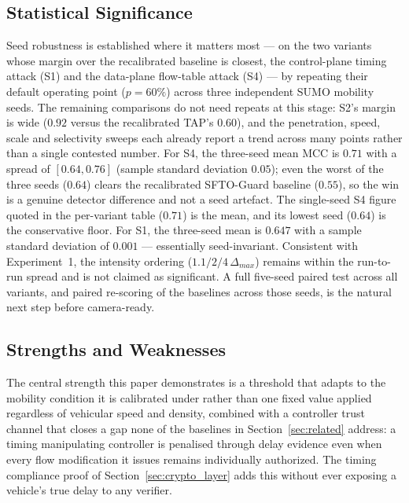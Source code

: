 \documentclass[final,5p,twocolumn]{elsarticle}
\theoremstyle{remark}
\theoremstyle{plain}
\begin{document}
\subsection{Statistical Significance}
\label{sec:significance}
Seed robustness is established where it matters most --- on the two variants
whose margin over the recalibrated baseline is closest, the control-plane timing
attack (S1) and the data-plane flow-table attack (S4) --- by repeating their
default operating point ($p{=}60\%$) across three independent SUMO mobility
seeds. The remaining comparisons do not need repeats at this stage: S2's margin
is wide ($0.92$ versus the recalibrated TAP's $0.60$), and the penetration,
speed, scale and selectivity sweeps each already report a trend across many
points rather than a single contested number. For S4, the three-seed mean MCC is
$0.71$ with a spread of $[0.64, 0.76]$ (sample standard deviation $0.05$); even
the worst of the three seeds ($0.64$) clears the recalibrated SFTO-Guard baseline
($0.55$), so the win is a genuine detector difference and not a seed artefact.
The single-seed S4 figure quoted in the per-variant table ($0.71$) is the mean,
and its lowest seed ($0.64$) is the conservative floor. For S1, the three-seed
mean is $0.647$ with a sample standard deviation of $0.001$ --- essentially
seed-invariant. Consistent with Experiment~1, the intensity ordering
($1.1/2/4\,\Delta_{max}$) remains within the run-to-run spread and is not claimed
as significant. A full five-seed paired test across all variants, and paired
re-scoring of the baselines across those seeds, is the natural next step before
camera-ready.

\subsection{Strengths and Weaknesses}
The central strength this paper demonstrates is a threshold that adapts to
the mobility condition it is calibrated under rather than one fixed value
applied regardless of vehicular speed and density, combined with a
controller trust channel that closes a gap none of the baselines in
Section~\ref{sec:related} address: a timing manipulating controller is
penalised through delay evidence even when every flow modification it
issues remains individually authorized. The timing compliance proof of
Section~\ref{sec:crypto_layer} adds this without ever exposing a vehicle's
true delay to any verifier.
\end{document}
